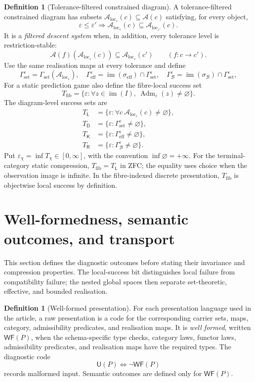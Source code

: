 \documentclass[11pt]{article}
\theoremstyle{plain}
\theoremstyle{definition}
\newtheorem{definition}[theorem]{Definition}
\theoremstyle{remark}
\newcommand{\im}{\operatorname{im}}
\newcommand{\Adm}{\operatorname{Adm}}
\newcommand{\LocalAdm}{\mathcal{A}_{\mathrm{loc}}}
\newcommand{\eps}{\varepsilon}
\begin{document}
\begin{definition}[Tolerance-filtered constrained diagram]\label{def:epsEC}
A tolerance-filtered constrained diagram has subsets
$\LocalAdm_\eps(c)\subseteq\mathcal A(c)$ satisfying, for every object,
\[
\eps\le\eps'
\Longrightarrow
\LocalAdm_\eps(c)\subseteq\LocalAdm_{\eps'}(c).
\]
It is a \emph{filtered descent system} when, in addition, every tolerance level
is restriction-stable:
\[
\mathcal A(f)(\LocalAdm_\eps(c))
\subseteq\LocalAdm_\eps(c')
\qquad(f:c\to c').
\]
Use the same realisation maps at every tolerance and define
\[
\Gamma_{\mathrm{set}}^\eps
=\Gamma_{\mathrm{set}}(\LocalAdm_\eps),\quad
\Gamma_{\mathrm{eff}}^\eps
=\im(\sigma_{\mathrm{eff}})\cap\Gamma_{\mathrm{set}}^\eps,
\quad
\Gamma_{\mathcal B}^\eps
=\im(\sigma_{\mathcal B})\cap\Gamma_{\mathrm{set}}^\eps,
\]
For a static prediction game also define the fibre-local success set
\[
T_{\mathrm{fib}}
=\{\eps:\forall z\in\im(I),\ \Adm_\eps(z)\ne\varnothing\}.
\]
The diagram-level success sets are
\begin{align*}
T_{\mathsf L}&=\{\eps:\forall c\ \LocalAdm_\eps(c)\ne\varnothing\},\\
T_{\mathsf D}&=\{\eps:\Gamma_{\mathrm{set}}^\eps\ne\varnothing\},\\
T_{\mathsf K}&=\{\eps:\Gamma_{\mathrm{eff}}^\eps\ne\varnothing\},\\
T_{\mathsf R}&=\{\eps:\Gamma_{\mathcal B}^\eps\ne\varnothing\}.
\end{align*}
Put $\eps_\chi=\inf T_\chi\in[0,\infty]$, with the convention
$\inf\varnothing=+\infty$.
For the terminal-category static compression, $T_{\mathrm{fib}}=T_{\mathsf L}$ in ZFC;
the equality uses choice when the observation image is infinite. In the
fibre-indexed discrete presentation, $T_{\mathrm{fib}}$ is objectwise local
success by definition.
\end{definition}

\section{Well-formedness, semantic outcomes, and transport}\label{sec:ladder}

This section defines the diagnostic outcomes before stating their invariance and
compression properties. The local-success bit distinguishes local failure from
compatibility failure; the nested global spaces then separate set-theoretic,
effective, and bounded realisation.

\begin{definition}[Well-formed presentation]\label{def:levels}
For each presentation language used in the article, a raw presentation is a code for the
corresponding carrier sets, maps, category, admissibility predicates, and
realisation maps. It is \emph{well formed}, written $\mathsf{WF}(P)$, when the
schema-specific type checks, category laws, functor laws, admissibility
predicates, and realisation maps have the required types. The diagnostic code
\[
\mathsf U(P)\iff\neg\mathsf{WF}(P)
\]
records malformed input. Semantic outcomes are defined only for
$\mathsf{WF}(P)$.
\end{definition}
\end{document}

